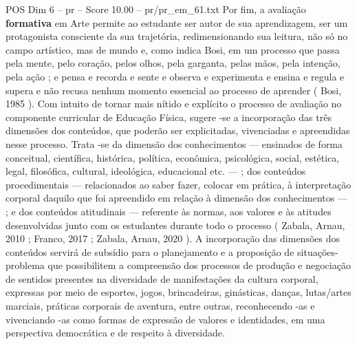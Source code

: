 \begin{textsample}{POS Dim 6 – pr – Score 10.00 – pr/pr\_em\_61.txt}  \label{ex:f6_pos_022}
Por fim, a avaliação \textbf{formativa} em Arte permite ao estudante ser autor de sua aprendizagem, ser um protagonista consciente da sua trajetória, redimensionando sua leitura, não só no campo artístico, mas de mundo e, como indica Bosi, em um processo que passa pela mente, pelo coração, pelos olhos, pela garganta, pelas mãos, pela intenção, pela ação ; e pensa e recorda e sente e observa e experimenta e ensina e regula e supera e não recusa nenhum momento essencial ao processo de aprender ( Bosi, 1985 ).
Com intuito de tornar mais nítido e explícito o processo de avaliação no componente curricular de Educação Física, sugere -se a incorporação das três dimensões dos conteúdos, que poderão ser explicitadas, vivenciadas e apreendidas nesse processo.
Trata -se da dimensão dos conhecimentos — ensinados de forma conceitual, científica, histórica, política, econômica, psicológica, social, estética, legal, filosófica, cultural, ideológica, educacional etc. — ; dos conteúdos procedimentais — relacionados ao saber fazer, colocar em prática, à interpretação corporal daquilo que foi apreendido em relação à dimensão dos conhecimentos — ; e dos conteúdos atitudinais — referente às normas, aos valores e às atitudes desenvolvidas junto com os estudantes durante todo o processo ( Zabala, Arnau, 2010 ; Franco, 2017 ; Zabala, Arnau, 2020 ).
A incorporação das dimensões dos conteúdos servirá de subsídio para o planejamento e a proposição de situações-problema que possibilitem a compreensão dos processos de produção e negociação de sentidos presentes na diversidade de manifestações da cultura corporal, expressas por meio de esportes, jogos, brincadeiras, ginásticas, danças, lutas/artes marciais, práticas corporais de aventura, entre outras, reconhecendo -as e vivenciando -as como formas de expressão de valores e identidades, em uma perspectiva democrática e de respeito à diversidade.

\end{textsample}
